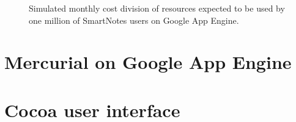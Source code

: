 \begin{figure}[ht]
  \begin{center}
  \end{center}
  \caption{Simulated monthly cost division of resources expected to be used by one million of SmartNotes users on Google App Engine.}
  \label{fig:gae_cost}
\end{figure}


\section{Mercurial on Google App Engine}\label{sec:hg_on_gae}
\section{Cocoa user interface}\label{sec:cocoa}